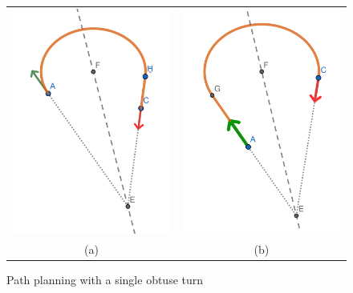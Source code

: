 \documentclass{article}
\begin{document}
\begin{figure}[hbt]  
  \begin{tabular}{cc}
    \includegraphics[width=3in]{screenshots/single-obtuse-turn-rot-trans.png} &
    \includegraphics[width=3in]{screenshots/single-obtuse-turn-trans-rot.png}\\
    (a) & (b)\\
  \end{tabular} 
  \caption{Path planning with a single obtuse turn}
  \label{fig:path1turnobtuse}
\end{figure}
\end{document}
